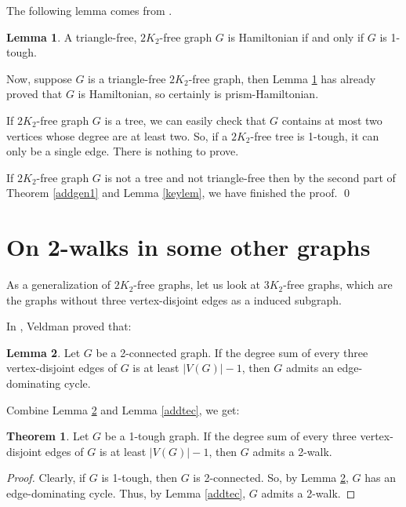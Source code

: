 \documentclass{amsart}
\theoremstyle{definition}
\newtheorem{theorem}{Theorem}
\newtheorem{lemma}{Lemma}
\begin{document}
The following lemma comes from \cite{broersma2014toughness}.
\begin{lemma}\cite[Theorem 4]{broersma2014toughness}\label{lembroet4}
A triangle-free, $2K_2$-free graph $G$ is Hamiltonian if and only if $G$ is 1-tough.
\end{lemma}

Now, suppose $G$ is a triangle-free $2K_2$-free graph, then Lemma \ref{lembroet4} has already proved that $G$ is Hamiltonian, so certainly is prism-Hamiltonian.

If $2K_2$-free graph $G$ is a tree, we can easily check that $G$ contains at most two vertices whose degree are at least two. So, if a $2K_2$-free tree is 1-tough, it can only be a single edge. There is nothing to prove.


If $2K_2$-free graph $G$ is not a tree and not triangle-free then by the second part of Theorem \ref{addgen1} and Lemma \ref{keylem}, we have finished the proof.
\qed











\section{On 2-walks in some other graphs}
As a generalization of $2K_2$-free graphs, let us look at $3K_2$-free graphs, which are the graphs without three vertex-disjoint edges as a induced subgraph.

In \cite{veldman83}, Veldman proved that:
\begin{lemma}\label{gen3k2de}{\cite[Corollary 3.2]{veldman83}}
Let $G$ be a 2-connected graph. If the degree sum of every three vertex-disjoint edges of $G$ is at least $|V(G)|-1$, then $G$ admits an edge-dominating cycle.
\end{lemma}

Combine Lemma \ref{gen3k2de} and Lemma \ref{addtec}, we get:

\begin{theorem}\label{2w3k2f}
Let $G$ be a 1-tough graph. If the degree sum of every three vertex-disjoint edges of $G$ is at least $|V(G)|-1$, then $G$ admits a 2-walk.
\end{theorem}

\begin{proof}
Clearly, if $G$ is 1-tough, then $G$ is 2-connected. So, by Lemma \ref{gen3k2de}, $G$ has an edge-dominating cycle. Thus, by Lemma \ref{addtec}, $G$ admits a 2-walk.
\end{proof}
\end{document}

